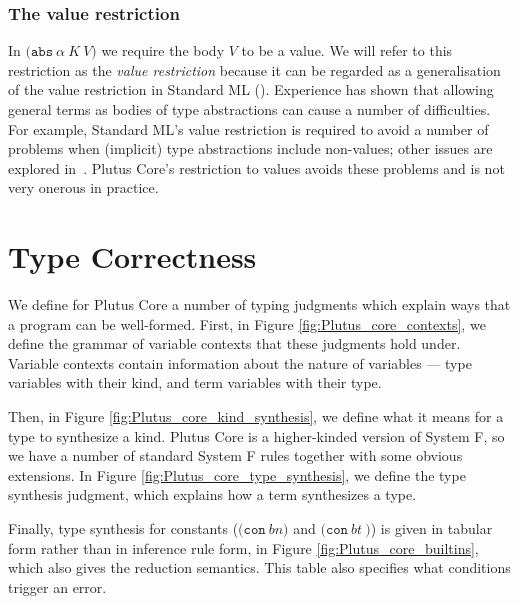 \documentclass[a4paper]{article}
\newcommand{\keyword}[1]{\texttt{#1}}
\newcommand{\construct}[1]{\texttt{(} #1 \texttt{)}}
\newcommand{\con}[1]{\construct{\keyword{con} ~ #1}}
\newcommand{\abs}[3]{\construct{\keyword{abs} ~ #1 ~ #2 ~ #3}}
\newcommand{\conT}[2]{\construct{\keyword{con} ~ #1 ~ #2}}
\begin{document}
%


\subsubsection{The value restriction}
In $\abs{\alpha}{K}{V}$ we require the body $V$ to be a value. We will
refer to this restriction as the \textit{value restriction} because it
can be regarded as a generalisation of the value restriction in
Standard ML (\cite[22.7]{Pierce:TAPL}). Experience has shown that
allowing general terms as bodies of type abstractions can cause a
number of difficulties.  For example, Standard ML's value restriction
is required to avoid a number of problems when (implicit) type
abstractions include non-values; other issues are explored
in~\cite[2.4]{Ahmed:2017}. Plutus Core's restriction to values avoids
these problems and is not very onerous in practice.
  


\section{Type Correctness}

We define for Plutus Core a number of typing judgments which explain ways that a program can be well-formed. First, in Figure \ref{fig:Plutus_core_contexts}, we define the grammar of variable contexts that these judgments hold under. Variable contexts contain information about the nature of variables --- type variables with their kind, and term variables with their type.

Then, in Figure \ref{fig:Plutus_core_kind_synthesis}, we define what it means for a type to synthesize a kind. Plutus Core is a higher-kinded version of System F, so we have a number of standard System F rules together with some obvious extensions. In Figure \ref{fig:Plutus_core_type_synthesis}, we define the type synthesis judgment, which explains how a term synthesizes a type.

Finally, type synthesis for constants ($\con{bn}$ and $\conT{bt}\!\!$)
is given in tabular form rather than in inference rule form, in Figure \ref{fig:Plutus_core_builtins}, which also gives the reduction semantics. This table also specifies what conditions trigger an error.






\end{document}
